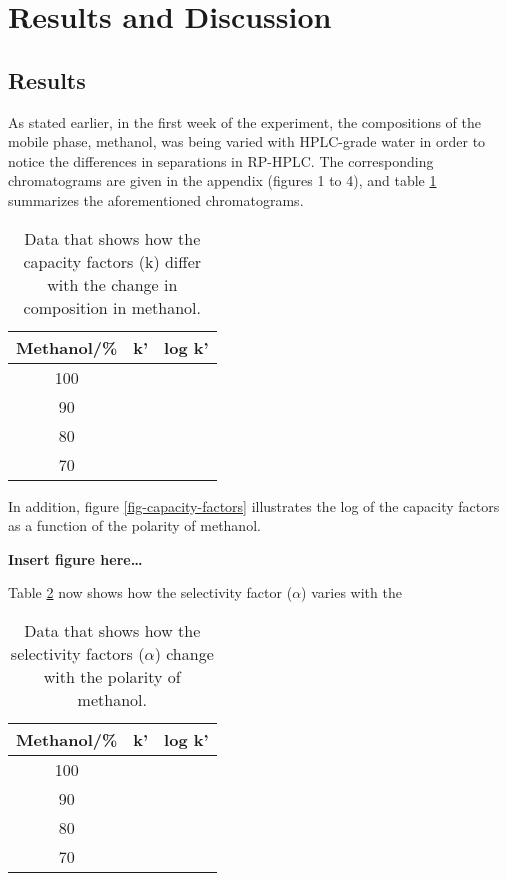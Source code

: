 \documentclass[a4paper, 12pt]{article}
\begin{document}

\section{Results and Discussion}

\subsection{Results}
As stated earlier, in the first week of the experiment, the compositions of the mobile phase, methanol, was being varied with HPLC-grade water in order to notice the differences in separations in RP-HPLC. The corresponding chromatograms are given in the appendix (figures 1 to 4), and table \ref{tab-capacity-factors} summarizes the aforementioned chromatograms.

\begin{table}[h!]
	\centering
	\begin{tabular}{|c|c|c|}
		\hline
		Methanol/\% & k' & log k' \\
		\hline
		100 & & \\
		\hline
		90 & & \\
		\hline
		80 & & \\
		\hline
		70 & & \\
		\hline
	\end{tabular}
	\caption{Data that shows how the capacity factors (k) differ with the change in composition in methanol.}
	\label{tab-capacity-factors}
\end{table}

In addition, figure \ref{fig-capacity-factors} illustrates the log of the capacity factors as a function of the polarity of methanol.

\textbf{Insert figure here\dots}

Table \ref{tab-selectivity} now shows how the selectivity factor ($\alpha$) varies with the 

\begin{table}[h!]
	\centering
	\begin{tabular}{|c|c|c|}
		\hline
		Methanol/\% & k' & log k' \\
		\hline
		100 & & \\
		\hline
		90 & & \\
		\hline
		80 & & \\
		\hline
		70 & & \\
		\hline
	\end{tabular}
	\caption{Data that shows how the selectivity factors ($\alpha$) change with the polarity of methanol.}
	\label{tab-selectivity}
\end{table}
\end{document}
